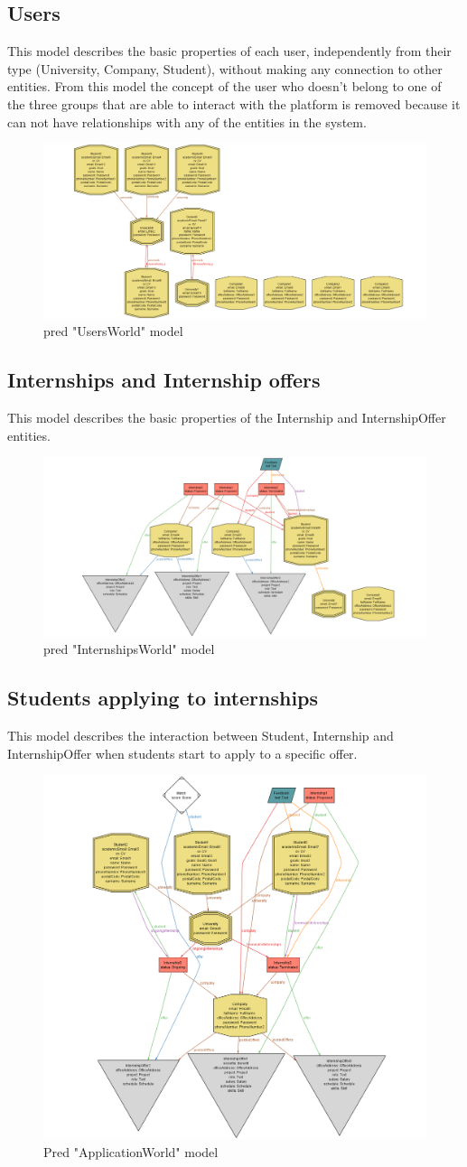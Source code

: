\subsection{Users}
This model describes the basic properties of each user, independently from their type (University, Company, Student), without making any connection to other entities.
From this model the concept of the user who doesn't belong to one of the three groups that are able to interact with the platform is removed because it can not have relationships with any of the entities in the system.
\begin{figure}
    \centering
    \includegraphics[width=0.5\linewidth]{Images/Alloy/Users.png}
    \caption{pred "UsersWorld" model}
    \label{fig:enter-label}
\end{figure}
\subsection{Internships and Internship offers}
This model describes the basic properties of the Internship and InternshipOffer entities.
\begin{figure}
    \centering
    \includegraphics[width=0.5\linewidth]{Images/Alloy/Internship .png}
    \caption{pred "InternshipsWorld" model}
    \label{fig:enter-label}
\end{figure}
\subsection{Students applying to internships}
This model describes the interaction between Student, Internship and InternshipOffer when students start to apply to a specific offer. 
\begin{figure}
    \centering
    \includegraphics[width=0.5\linewidth]{Images/Alloy/Application.png}
    \caption{Pred "ApplicationWorld" model}
    \label{fig:enter-label}
\end{figure}
